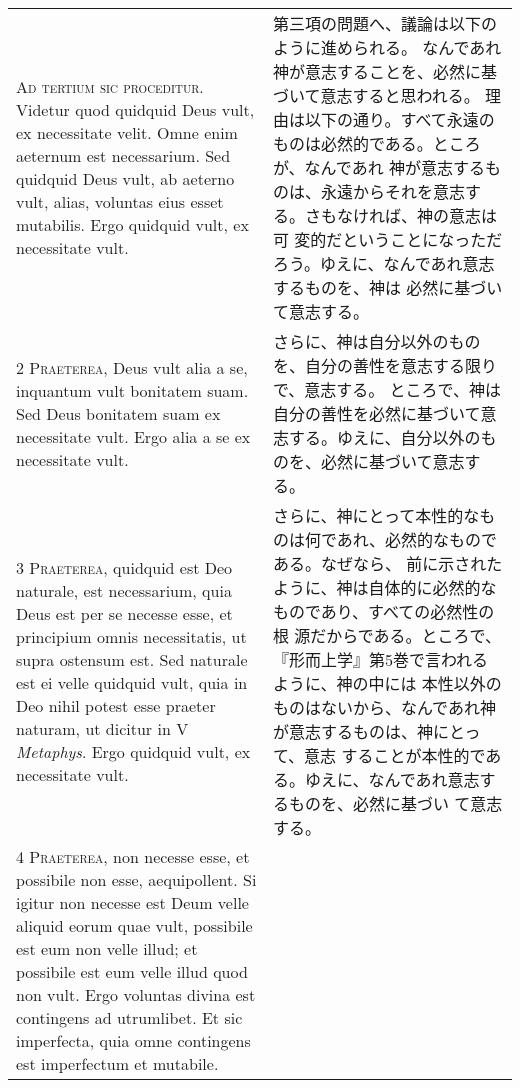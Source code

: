 \documentclass[10pt]{jsarticle} %
\begin{document}
\begin{longtable}{p{21em}p{21em}}

{\huge A}{\scshape d tertium sic proceditur}. Videtur quod
quidquid Deus vult, ex necessitate velit. Omne enim aeternum est
necessarium. Sed quidquid Deus vult, ab aeterno vult, alias, voluntas
eius esset mutabilis. Ergo quidquid vult, ex necessitate vult.


&

 第三項の問題へ、議論は以下のように進められる。
なんであれ神が意志することを、必然に基づいて意志すると思われる。
 理由は以下の通り。すべて永遠のものは必然的である。ところが、なんであれ
 神が意志するものは、永遠からそれを意志する。さもなければ、神の意志は可
 変的だということになっただろう。ゆえに、なんであれ意志するものを、神は
 必然に基づいて意志する。
 
\\


{\scshape 2 Praeterea}, Deus vult alia a se, inquantum
vult bonitatem suam. Sed Deus bonitatem suam ex necessitate vult. Ergo
alia a se ex necessitate vult.


&

 さらに、神は自分以外のものを、自分の善性を意志する限りで、意志する。
 ところで、神は自分の善性を必然に基づいて意志する。ゆえに、自分以外のも
 のを、必然に基づいて意志する。
 

\\


{\scshape 3 Praeterea}, quidquid est Deo naturale, est
necessarium, quia Deus est per se necesse esse, et principium omnis
necessitatis, ut supra ostensum est. Sed naturale est ei velle quidquid
vult, quia in Deo nihil potest esse praeter naturam, ut dicitur in V
{\itshape Metaphys}. Ergo quidquid vult, ex necessitate vult.


&

さらに、神にとって本性的なものは何であれ、必然的なものである。なぜなら、
 前に示されたように、神は自体的に必然的なものであり、すべての必然性の根
 源だからである。ところで、『形而上学』第5巻で言われるように、神の中には
 本性以外のものはないから、なんであれ神が意志するものは、神にとって、意志
 することが本性的である。ゆえに、なんであれ意志するものを、必然に基づい
 て意志する。
 

\\


{\scshape 4 Praeterea}, non necesse esse, et possibile
non esse, aequipollent. Si igitur non necesse est Deum velle aliquid
eorum quae vult, possibile est eum non velle illud; et possibile est eum
velle illud quod non vult. Ergo voluntas divina est contingens ad
utrumlibet. Et sic imperfecta, quia omne contingens est imperfectum et
mutabile.



\end{longtable}
\end{document}
